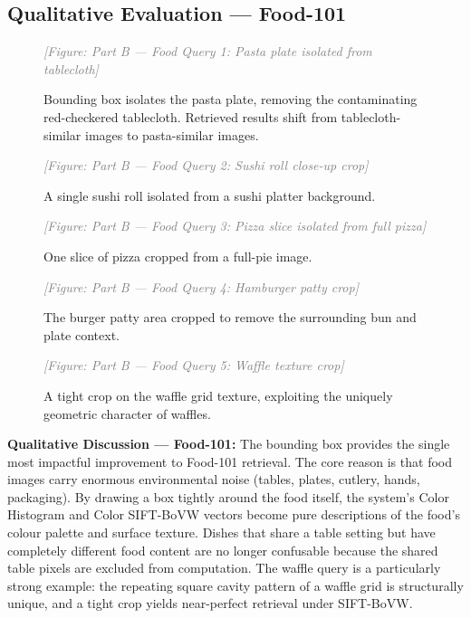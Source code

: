 \documentclass[11pt, a4paper]{article}
\newcommand{\imagebox}[2]{%
  \begin{mdframed}[backgroundcolor=gray!15, linecolor=gray!50, linewidth=1pt]
    \centering
    \vspace{#2}
    \textcolor{gray}{\textit{[Figure: #1]}}
    \vspace{#2}
  \end{mdframed}
}
\begin{document}
\subsection{Qualitative Evaluation — Food-101}

\begin{figure}[H]
  \centering
  \imagebox{Part B — Food Query 1: Pasta plate isolated from tablecloth}{3cm}
  \caption{Bounding box isolates the pasta plate, removing the contaminating red-checkered tablecloth. Retrieved results shift from tablecloth-similar images to pasta-similar images.}
  \label{fig:partB_food_1}
\end{figure}

\begin{figure}[H]
  \centering
  \imagebox{Part B — Food Query 2: Sushi roll close-up crop}{3cm}
  \caption{A single sushi roll isolated from a sushi platter background.}
  \label{fig:partB_food_2}
\end{figure}

\begin{figure}[H]
  \centering
  \imagebox{Part B — Food Query 3: Pizza slice isolated from full pizza}{3cm}
  \caption{One slice of pizza cropped from a full-pie image.}
  \label{fig:partB_food_3}
\end{figure}

\begin{figure}[H]
  \centering
  \imagebox{Part B — Food Query 4: Hamburger patty crop}{3cm}
  \caption{The burger patty area cropped to remove the surrounding bun and plate context.}
  \label{fig:partB_food_4}
\end{figure}

\begin{figure}[H]
  \centering
  \imagebox{Part B — Food Query 5: Waffle texture crop}{3cm}
  \caption{A tight crop on the waffle grid texture, exploiting the uniquely geometric character of waffles.}
  \label{fig:partB_food_5}
\end{figure}

\textbf{Qualitative Discussion — Food-101:} The bounding box provides the single most impactful improvement to Food-101 retrieval. The core reason is that food images carry enormous environmental noise (tables, plates, cutlery, hands, packaging). By drawing a box tightly around the food itself, the system's Color Histogram and Color SIFT-BoVW vectors become pure descriptions of the food's colour palette and surface texture. Dishes that share a table setting but have completely different food content are no longer confusable because the shared table pixels are excluded from computation. The waffle query is a particularly strong example: the repeating square cavity pattern of a waffle grid is structurally unique, and a tight crop yields near-perfect retrieval under SIFT-BoVW.
\end{document}
